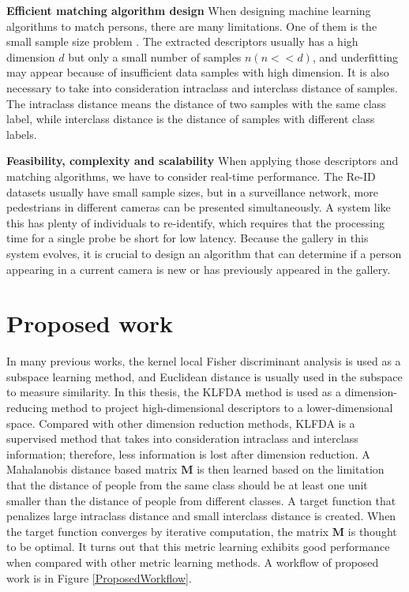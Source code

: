 \textbf{Efficient matching algorithm design} 	
When designing machine learning algorithms to match persons, there are many limitations. One of them is the small sample size problem \cite{NFST}. The extracted descriptors usually has a high dimension $d$ but only a small number of samples $n(n<<d)$, and underfitting may appear because of insufficient data samples with high dimension. It is also necessary to take into consideration intraclass and interclass distance of samples. The intraclass distance means the distance of two samples with the same class label, while interclass distance is the distance of samples with different class labels. 

\textbf{Feasibility, complexity and scalability} When applying those descriptors and matching algorithms, we have to consider real-time performance. The Re-ID datasets usually have small sample sizes, but in a surveillance network, more pedestrians in different cameras can be presented simultaneously. A system like this has plenty of individuals to re-identify, which requires that the processing time for a single probe be short for low latency. Because the gallery in this system evolves, it is crucial to design an algorithm that can determine if a person appearing in a current camera is new or has previously appeared in the gallery.

\section{Proposed work}
In many previous works, the kernel local Fisher discriminant analysis is used as a subspace learning method, and Euclidean distance is usually used in the subspace to measure similarity. In this thesis, the KLFDA \cite{KLFDA} method is used as a dimension-reducing method to project high-dimensional descriptors to a lower-dimensional space. Compared with other dimension reduction methods, KLFDA is a supervised method that takes into consideration intraclass and interclass information; therefore, less information is lost after dimension reduction. A Mahalanobis distance based matrix $\bm{M}$ is then learned based on the limitation that the distance of people from the same class should be at least one unit smaller than the distance of people from different classes. A target function that penalizes large intraclass distance and small interclass distance is created. When the target function converges by iterative computation, the matrix $\bm{M}$ is thought to be optimal. It turns out that this metric learning exhibits good performance when compared with other metric learning methods. A workflow of proposed work is in Figure \ref{ProposedWorkflow}.

